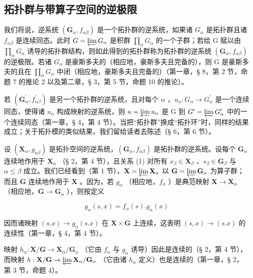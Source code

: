 \subsection{拓扑群与带算子空间的逆极限}

我们将说，逆系统 \((\mathbf{G}_{\alpha}, f_{\alpha\beta})\) 是一个拓扑群的逆系统，如果诸 \(G_{\alpha}\) 是拓扑群且诸 \(f_{\alpha\beta}\) 是连续同态。此时 \(G = \varprojlim G_{\alpha}\) 是积群 \(\prod_{\alpha} G_{\alpha}\) 的一个子群；若给 G 赋以由 \(\prod_{\alpha} G_{\alpha}\) 诱导的拓扑群结构，则如此得到的拓扑群称为拓扑群的逆系统 \((\mathbf{G}_{\alpha}, f_{\alpha\beta})\) 的逆极限。若诸 \(G_{\alpha}\) 是豪斯多夫的（相应地，豪斯多夫且完备的），则 G 是豪斯多夫的且在 \(\prod_{\alpha} G_{\alpha}\) 中闭（相应地，豪斯多夫且完备的）（第一章，§ 8，第 2 节，命题 7 的推论 2 以及第二章，§ 3，第 5 节，命题 10 的推论）。

若 \((\mathbf{G}_{\alpha}^{\prime}, f_{\alpha\beta}^{\prime})\) 是另一个拓扑群的逆系统，且对每个 \(\alpha\) ，\(u_{\alpha}: G_{\alpha} \to G_{\alpha}^{\prime}\) 是一个连续同态，使得诸 \(u_{\alpha}\) 构成映射的逆系统，则 \(u = \varprojlim u_{\alpha}\) 是 G 到 \(G^{\prime} = \varprojlim G_{\alpha}^{\prime}\) 中的一个连续同态（第一章，§ 4，第 4 节）。当把“拓扑群”换成“拓扑环”时，同样的结果成立；关于拓扑模的类似结果，我们留给读者去陈述（§ 6，第 6 节）。

设 \((\mathbf{X}_{\alpha}, g_{\alpha \beta})\) 是拓扑空间的逆系统，\((\mathbf{G}_{\alpha}, f_{\alpha \beta})\) 是拓扑群的逆系统。设每个 \(\mathbf{G}_{\alpha}\) 连续地作用于 \(\mathbf{X}_{\alpha}\) （§ 2，第 4 节），且关系 (1) 对所有 \(x_{\beta} \in \mathbf{X}_{\beta}\) 、\(s_{\beta} \in \mathbf{G}_{\beta}\) 与 \(\alpha \leqslant \beta\) 成立。我们已经看到（第 1 节），\(\mathbf{X} = \varprojlim \mathbf{X}_{\alpha}\) 以 \(\mathbf{G} = \varprojlim \mathbf{G}_{\alpha}\) 为算子群；而且 \(\mathbf{G}\) 连续地作用于 \(\mathbf{X}\) 。因为，若 \(g_{\alpha}\) （相应地，\(f_{\alpha}\) ）是典范映射 \(\mathbf{X} \to \mathbf{X}_{\alpha}\) （相应地，\(\mathbf{G} \to \mathbf{G}_{\alpha}\) ），则按定义

\[
g _ {\alpha} (s, x) = f _ {\alpha} (s). g _ {\alpha} (x)
\]

因而诸映射 \((s.x) \to g_{\alpha}(s.x)\) 在 \(\mathbf{X} \times \mathbf{G}\) 上连续，这表明 \((s, x) \to (s.x)\) 的连续性（第一章，§ 4，第 4 节）。

映射 \(h_{\alpha}: \mathbf{X} / \mathbf{G} \to \mathbf{X}_{\alpha} / \mathbf{G}_{\alpha}\) （它由 \(f_{\alpha}\) 与 \(g_{\alpha}\) 诱导）因此是连续的（§ 2，第 4 节），而映射 \(h: \mathbf{X} / \mathbf{G} \to \varprojlim \mathbf{X}_{\alpha} / \mathbf{G}_{\alpha}\) （它由诸 \(h_{\alpha}\) 定义）也是连续的（第一章，§ 2，第 3 节，命题 4）。

